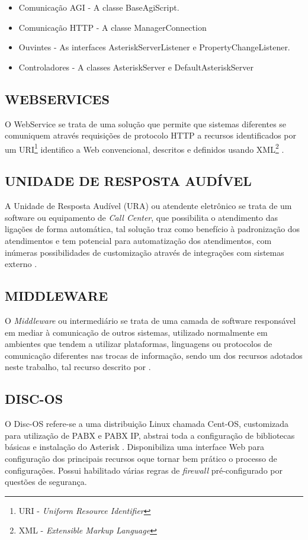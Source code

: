 \begin{itemize}
	\item Comunicação AGI - A classe BaseAgiScript.
	\item Comunicação HTTP - A classe ManagerConnection
	\item Ouvintes - As interfaces AsteriskServerListener e PropertyChangeListener.
	\item Controladores - A classes AsteriskServer e DefaultAsteriskServer
\end{itemize}


\subsection{\textbf{\uppercase{WebServices}}}
O WebService se trata de uma solução que permite que sistemas diferentes se comuniquem através requisições de protocolo HTTP a recursos identificados por um URI\footnote{URI - \textit{Uniform Resource Identifier}}  identifico a Web convencional, descritos e definidos usando XML\footnote{XML - \textit{Extensible Markup Language}} .

\subsection{\textbf{\uppercase{Unidade de Resposta Audível}}}
A Unidade de Resposta Audível\label{key:URA} (URA) ou atendente eletrônico se trata de um software ou equipamento de \textit{Call Center}, que possibilita o atendimento das ligações de forma automática, tal solução traz como benefício à padronização dos atendimentos e tem potencial para automatização dos atendimentos, com inúmeras possibilidades de customização através de integrações com sistemas externo \cite{VIEIRA:2007}.

\subsection{\textbf{\uppercase{Middleware}}}
O \textit{Middleware} ou intermediário se trata de uma camada de software responsável em mediar à comunicação de outros sistemas, utilizado normalmente em ambientes que tendem a utilizar plataformas, linguagens ou protocolos de comunicação diferentes nas trocas de informação, sendo um dos recursos adotados neste trabalho, tal recurso descrito por .

\subsection{\textbf{\uppercase{Disc-OS}}}
O Disc-OS refere-se a uma distribuição Linux chamada Cent-OS, customizada para utilização de PABX e PABX IP, abstrai toda a configuração de bibliotecas básicas e instalação do Asterisk \cite{DARU:2008}. Disponibiliza uma interface Web para configuração dos principais recursos oque tornar bem prático o processo de configurações. Possui habilitado várias regras de \textit{firewall} pré-configurado por questões de segurança.

